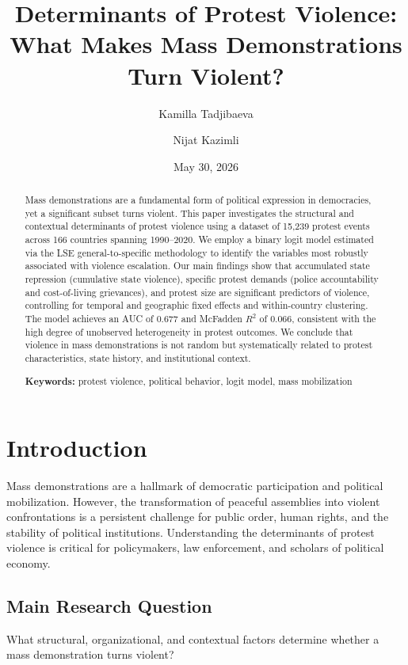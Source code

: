 \documentclass[11pt,a4paper]{article}
\title{Determinants of Protest Violence: What Makes Mass Demonstrations Turn Violent?}
\author{Kamilla Tadjibaeva \and Nijat Kazimli}
\date{May 30, 2026}
\begin{document}
\maketitle

\begin{abstract}
Mass demonstrations are a fundamental form of political expression in democracies, yet a significant subset turns violent. This paper investigates the structural and contextual determinants of protest violence using a dataset of 15,239 protest events across 166 countries spanning 1990--2020. We employ a binary logit model estimated via the LSE general-to-specific methodology to identify the variables most robustly associated with violence escalation. Our main findings show that accumulated state repression (cumulative state violence), specific protest demands (police accountability and cost-of-living grievances), and protest size are significant predictors of violence, controlling for temporal and geographic fixed effects and within-country clustering. The model achieves an AUC of 0.677 and McFadden $R^2$ of 0.066, consistent with the high degree of unobserved heterogeneity in protest outcomes. We conclude that violence in mass demonstrations is not random but systematically related to protest characteristics, state history, and institutional context.

\textbf{Keywords:} protest violence, political behavior, logit model, mass mobilization
\end{abstract}

\section{Introduction}

Mass demonstrations are a hallmark of democratic participation and political mobilization. However, the transformation of peaceful assemblies into violent confrontations is a persistent challenge for public order, human rights, and the stability of political institutions. Understanding the determinants of protest violence is critical for policymakers, law enforcement, and scholars of political economy.

\subsection{Main Research Question}
What structural, organizational, and contextual factors determine whether a mass demonstration turns violent?
\end{document}
